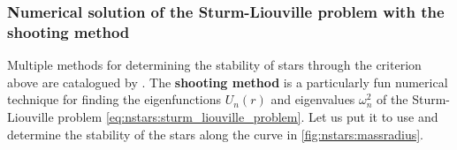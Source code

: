 
\subsubsection{Numerical solution of the Sturm-Liouville problem with the shooting method}

Multiple methods for determining the stability of stars through the criterion above are catalogued by \cite{ref:stability_methods}.
The \textbf{shooting method} is a particularly fun numerical technique for finding the eigenfunctions $U_n(r)$ and eigenvalues $\omega_n^2$ of the Sturm-Liouville problem \eqref{eq:nstars:sturm_liouville_problem}.
Let us put it to use and determine the stability of the stars along the curve in \cref{fig:nstars:massradius}.

